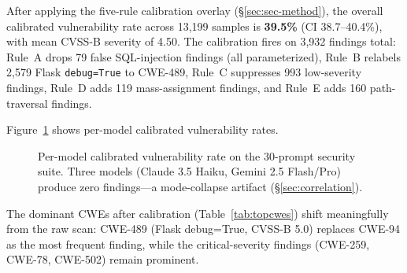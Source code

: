 \documentclass{article}
\newcommand{\code}[1]{\texttt{#1}}
\begin{document}
After applying the five-rule calibration overlay (\S\ref{sec:sec-method}),
the overall calibrated vulnerability rate across 13,199 samples is
\textbf{39.5\%} (CI 38.7--40.4\%), with mean CVSS-B severity of 4.50.
The calibration fires on 3,932 findings total: Rule~A drops 79 false
SQL-injection findings (all parameterized), Rule~B relabels 2,579 Flask
\code{debug=True} to CWE-489, Rule~C suppresses 993 low-severity findings,
Rule~D adds 119 mass-assignment findings, and Rule~E adds 160 path-traversal
findings.

Figure~\ref{fig:vuln-rates} shows per-model calibrated vulnerability rates.

\begin{figure}[t]
\centering
{}
\caption{Per-model calibrated vulnerability rate on the 30-prompt security
suite. Three models (Claude 3.5 Haiku, Gemini 2.5 Flash/Pro) produce zero
findings---a mode-collapse artifact (\S\ref{sec:correlation}).}
\label{fig:vuln-rates}
\end{figure}

The dominant CWEs after calibration (Table~\ref{tab:topcwes}) shift
meaningfully from the raw scan: CWE-489 (Flask debug=True, CVSS-B 5.0)
replaces CWE-94 as the most frequent finding, while the critical-severity
findings (CWE-259, CWE-78, CWE-502) remain prominent.
\end{document}
